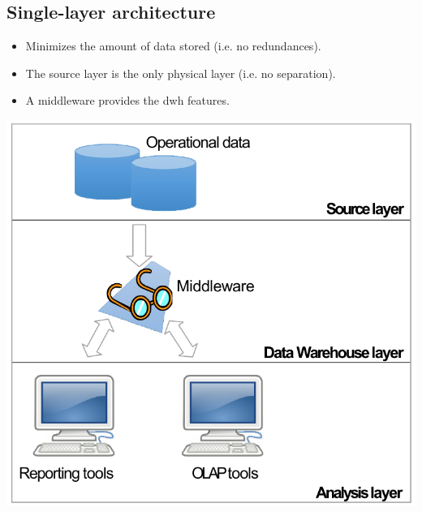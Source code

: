 \subsection{Single-layer architecture}
\begin{minipage}{0.55\textwidth}
    \begin{itemize}
        \item Minimizes the amount of data stored (i.e. no redundances).
        \item The source layer is the only physical layer (i.e. no separation).
        \item A middleware provides the \ac{dwh} features.
    \end{itemize}
\end{minipage}
\hfill
\begin{minipage}{0.4\textwidth}
    \centering
    \includegraphics[width=\linewidth]{img/_1layer_dwh.pdf}
\end{minipage}


